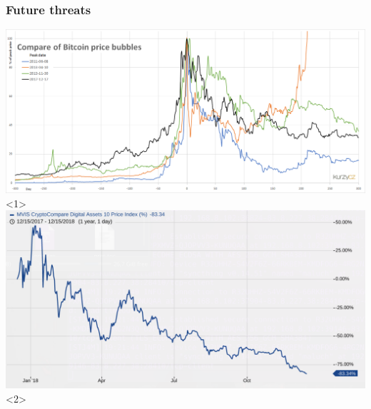 \documentclass{beamer}
\begin{document}
\begin{frame}
\frametitle{Future threats}
\includegraphics[width=\textwidth]{bubble-chart.png}<1>
\includegraphics[width=\textwidth]{mvis-chart.png}<2>
\end{frame}
\end{document}
